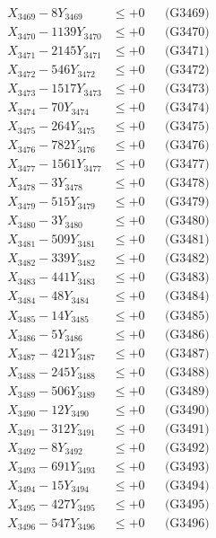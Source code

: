 \documentclass[a4paper,10pt]{article}
\begin{document}
{\begin{align}
X_{3469} - 8Y_{3469} &\leq +0 && \text{(G3469)} \\
X_{3470} - 1139Y_{3470} &\leq +0 && \text{(G3470)} \\
\allowbreak
X_{3471} - 2145Y_{3471} &\leq +0 && \text{(G3471)} \\
X_{3472} - 546Y_{3472} &\leq +0 && \text{(G3472)} \\
X_{3473} - 1517Y_{3473} &\leq +0 && \text{(G3473)} \\
X_{3474} - 70Y_{3474} &\leq +0 && \text{(G3474)} \\
X_{3475} - 264Y_{3475} &\leq +0 && \text{(G3475)} \\
X_{3476} - 782Y_{3476} &\leq +0 && \text{(G3476)} \\
X_{3477} - 1561Y_{3477} &\leq +0 && \text{(G3477)} \\
X_{3478} - 3Y_{3478} &\leq +0 && \text{(G3478)} \\
X_{3479} - 515Y_{3479} &\leq +0 && \text{(G3479)} \\
X_{3480} - 3Y_{3480} &\leq +0 && \text{(G3480)} \\
\allowbreak
X_{3481} - 509Y_{3481} &\leq +0 && \text{(G3481)} \\
X_{3482} - 339Y_{3482} &\leq +0 && \text{(G3482)} \\
X_{3483} - 441Y_{3483} &\leq +0 && \text{(G3483)} \\
X_{3484} - 48Y_{3484} &\leq +0 && \text{(G3484)} \\
X_{3485} - 14Y_{3485} &\leq +0 && \text{(G3485)} \\
X_{3486} - 5Y_{3486} &\leq +0 && \text{(G3486)} \\
X_{3487} - 421Y_{3487} &\leq +0 && \text{(G3487)} \\
X_{3488} - 245Y_{3488} &\leq +0 && \text{(G3488)} \\
X_{3489} - 506Y_{3489} &\leq +0 && \text{(G3489)} \\
X_{3490} - 12Y_{3490} &\leq +0 && \text{(G3490)} \\
\allowbreak
X_{3491} - 312Y_{3491} &\leq +0 && \text{(G3491)} \\
X_{3492} - 8Y_{3492} &\leq +0 && \text{(G3492)} \\
X_{3493} - 691Y_{3493} &\leq +0 && \text{(G3493)} \\
X_{3494} - 15Y_{3494} &\leq +0 && \text{(G3494)} \\
X_{3495} - 427Y_{3495} &\leq +0 && \text{(G3495)} \\
X_{3496} - 547Y_{3496} &\leq +0 && \text{(G3496)} \\

\end{align}}
\end{document}
